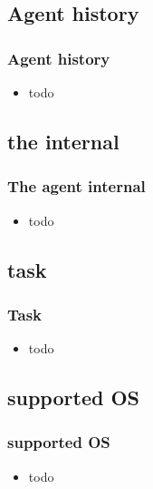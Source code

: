 %
\subsection{Agent history}
\begin{frame}
\frametitle{Agent history}

\begin{itemize}
%
\item todo
%
\end{itemize}
\end{frame}
\subsection{the internal}
\begin{frame}
\frametitle{The agent internal}
%
\begin{itemize}
%
\item todo 
%
\end{itemize}
\end{frame}

\subsection{task}
\begin{frame}
\frametitle{Task}
%
\begin{itemize}
%
\item todo 
%
\end{itemize}
\end{frame}



\subsection{supported OS}
\begin{frame}
\frametitle{supported OS}
%
\begin{itemize}
%
\item todo 
%
\end{itemize}
\end{frame}


